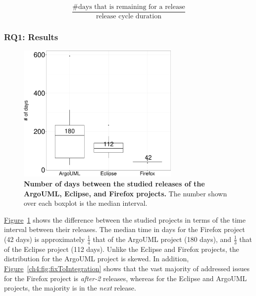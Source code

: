 \begin{equation}
	\frac{\text{\# days that is remaining for a release}}{\text{release cycle duration}}
	\label{ch4:eq:fixtiming}
\end{equation}

\subsubsection*{RQ1: Results} \label{results:rq1}

\begin{figure}[!t]
	\centering
	\includegraphics[width=0.7\textwidth]
	{chapters/chapter4/figures/RQ1_time_between_releases.pdf}
	\caption{\textbf{Number of days between the studied releases of the
	ArgoUML, Eclipse, and Firefox projects.} The number shown over each
boxplot is the median interval.}  
	\label{ch4:fig:releaseIntervals}
\end{figure}

\noindent\DIFdelbegin \textit{\textbf{}%
}
\DIFdelend \DIFaddbegin {}
\DIFaddend \hyperref[ch4:fig:releaseIntervals]{Figure}~\ref{ch4:fig:releaseIntervals} shows the
difference between the studied projects in terms of the time interval between
their releases. The median time in days for the Firefox project (42 days) is
approximately $\frac{1}{4}$ that of the ArgoUML project (180 days), and
$\frac{1}{3}$ that of the Eclipse project (112 days). Unlike the Eclipse and
Firefox projects, the distribution for the ArgoUML project is skewed. In
addition, \hyperref[ch4:fig:fixToIntegration]{Figure}~\ref{ch4:fig:fixToIntegration}
shows that the vast majority of addressed issues for the Firefox project is
\DIFdelbegin {}\DIFdelend \DIFaddbegin {}\DIFaddend \textit{after-2} releases, whereas for the Eclipse and ArgoUML projects, the
majority is \DIFdelbegin {}\DIFdelend \DIFaddbegin {}\DIFaddend in the \textit{next} release. 

